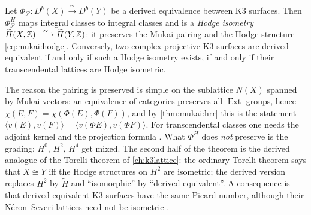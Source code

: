 \begin{theorem}\label{thm:mukai:isometry}
Let $\Phi_{\mathcal P}:D^b(X)\xrightarrow{\ \sim\ }D^b(Y)$ be a derived equivalence between K3
surfaces. Then $\Phi^H_{\mathcal P}$ maps integral classes to integral classes and is a
\emph{Hodge isometry}
$\widetilde H(X,\mathbb{Z})\xrightarrow{\ \sim\ }\widetilde H(Y,\mathbb{Z})$: it preserves the Mukai pairing and
the Hodge structure \eqref{eq:mukai:hodge}. Conversely, two complex projective K3 surfaces are
derived equivalent if and only if such a Hodge isometry exists, if and only if their
transcendental lattices are Hodge isometric.
\end{theorem}
The reason the pairing is preserved is simple on the sublattice $N(X)$ spanned by Mukai vectors:
an equivalence of categories preserves all $\operatorname{Ext}$ groups, hence
$\chi(E,F)=\chi(\Phi(E),\Phi(F))$, and by \cref{thm:mukai:hrr} this is the statement
$\langle v(E),v(F)\rangle=\langle v(\Phi E),v(\Phi F)\rangle$. For transcendental classes one needs
the adjoint kernel and the projection formula . What $\Phi^H$ does \emph{not} preserve is the grading: $H^0$, $H^2$, $H^4$
get mixed. The second half of the theorem is the derived analogue of the Torelli theorem of
\cref{ch:k3lattice}: the ordinary Torelli theorem says that $X\cong Y$ iff the Hodge structures
on $H^2$ are isometric; the derived version replaces $H^2$ by $\widetilde H$ and ``isomorphic''
by ``derived equivalent''. A consequence is that derived-equivalent K3 surfaces have the same
Picard number, although their N\'eron--Severi lattices need not be isometric
.

